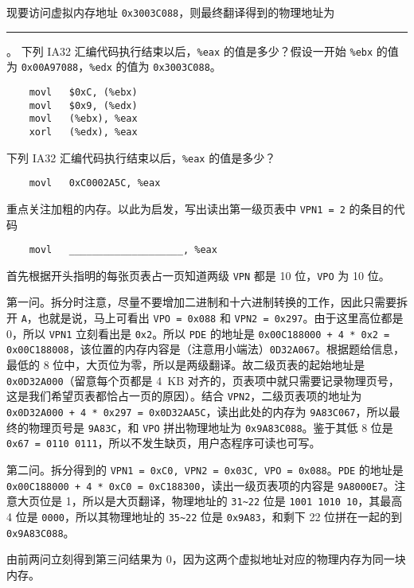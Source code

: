 \begin{problems}
        \qn 现要访问虚拟内存地址 \verb|0x3003C088|，则最终翻译得到的物理地址为 \rule{2.5cm}{0.25mm}。
        \qn 下列 IA32 汇编代码执行结束以后，\verb|%eax| 的值是多少？假设一开始 \verb|%ebx| 的值为 \verb|0x00A97088|，\verb|%edx| 的值为 \verb|0x3003C088|。
        \begin{verbatim}
    movl   $0xC, (%ebx)
    movl   $0x9, (%edx)
    movl   (%ebx), %eax
    xorl   (%edx), %eax
        \end{verbatim}
        \qn 下列 IA32 汇编代码执行结束以后，\verb|%eax| 的值是多少？
        \begin{verbatim}
    movl   0xC0002A5C, %eax
        \end{verbatim}
        重点关注加粗的内存。以此为启发，写出读出第一级页表中 \verb|VPN1 = 2| 的条目的代码
        \begin{verbatim}
    movl   ____________________, %eax
        \end{verbatim}
        \sol 首先根据开头指明的每张页表占一页知道两级 \verb|VPN| 都是 10 位，\verb|VPO| 为 10 位。
        
        第一问。拆分时注意，尽量不要增加二进制和十六进制转换的工作，因此只需要拆开 \verb|A|，也就是说，马上可看出 \verb|VPO = 0x088| 和 \verb|VPN2 = 0x297|。由于这里高位都是 0，所以 \verb|VPN1| 立刻看出是 \verb|0x2|。所以 \verb|PDE| 的地址是 \verb|0x00C188000 + 4 * 0x2 = 0x00C188008|，该位置的内存内容是（注意用小端法）\verb|0D32A067|。根据题给信息，最低的 8 位中，大页位为零，所以是两级翻译。故二级页表的起始地址是 \verb|0x0D32A000|（留意每个页都是 \SI{4}{KB} 对齐的，页表项中就只需要记录物理页号，这是我们希望页表都恰占一页的原因）。结合 \verb|VPN2|，二级页表项的地址为 \verb|0x0D32A000 + 4 * 0x297 = 0x0D32AA5C|，读出此处的内存为 \verb|9A83C067|，所以最终的物理页号是 \verb|9A83C|，和 \verb|VPO| 拼出物理地址为 \verb|0x9A83C088|。鉴于其低 8 位是 \verb|0x67 = 0110 0111|，所以不发生缺页，用户态程序可读也可写。

        第二问。拆分得到的 \verb|VPN1 = 0xC0, VPN2 = 0x03C, VPO = 0x088|。\verb|PDE| 的地址是 \verb|0x00C188000 + 4 * 0xC0 = 0xC188300|，读出一级页表项的内容是 \verb|9A8000E7|。注意大页位是 1，所以是大页翻译，物理地址的 \texttt{31\textasciitilde 22} 位是 \verb|1001 1010 10|，其最高 4 位是 \verb|0000|，所以其物理地址的 \texttt{35\textasciitilde 22} 位是 \verb|0x9A83|，和剩下 22 位拼在一起的到 \verb|0x9A83C088|。

        由前两问立刻得到第三问结果为 0，因为这两个虚拟地址对应的物理内存为同一块内存。


\end{problems}
